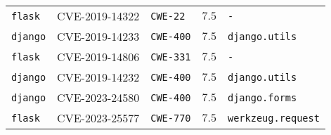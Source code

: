 \begin{table}
\begin{tabular}{lllll}
\texttt{flask} & CVE-2019-14322 & \texttt{CWE-22} & $7.5$ & \texttt{-} \\
\texttt{django} & CVE-2019-14233 & \texttt{CWE-400} & $7.5$ & \texttt{django.utils} \\
\texttt{flask} & CVE-2019-14806 & \texttt{CWE-331} & $7.5$ & \texttt{-} \\
\texttt{django} & CVE-2019-14232 & \texttt{CWE-400} & $7.5$ & \texttt{django.utils} \\
\texttt{django} & CVE-2023-24580 & \texttt{CWE-400} & $7.5$ & \texttt{django.forms} \\
\texttt{flask} & CVE-2023-25577 & \texttt{CWE-770} & $7.5$ & \texttt{werkzeug.request} \\
\bottomrule
\end{tabular}
\end{table}
